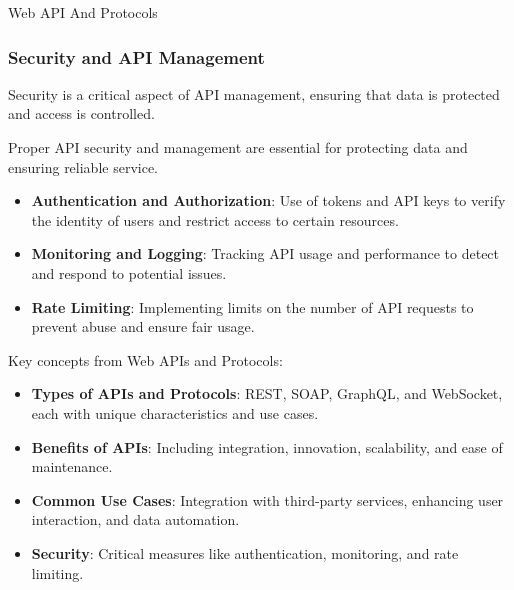 \begin{notes}{Web API And Protocols}
\begin{highlight}
    \end{highlight}
    
    \subsubsection*{Security and API Management}
    
    Security is a critical aspect of API management, ensuring that data is protected and access is controlled.
    
    \begin{highlight}
    
        Proper API security and management are essential for protecting data and ensuring reliable service.
        
        \begin{itemize}
            \item \textbf{Authentication and Authorization}: Use of tokens and API keys to verify the identity of users and restrict access to certain resources.
            \item \textbf{Monitoring and Logging}: Tracking API usage and performance to detect and respond to potential issues.
            \item \textbf{Rate Limiting}: Implementing limits on the number of API requests to prevent abuse and ensure fair usage.
        \end{itemize}
    
    \end{highlight}
    
    \begin{highlight}
    
        Key concepts from Web APIs and Protocols:
        
        \begin{itemize}
            \item \textbf{Types of APIs and Protocols}: REST, SOAP, GraphQL, and WebSocket, each with unique characteristics and use cases.
            \item \textbf{Benefits of APIs}: Including integration, innovation, scalability, and ease of maintenance.
            \item \textbf{Common Use Cases}: Integration with third-party services, enhancing user interaction, and data automation.
            \item \textbf{Security}: Critical measures like authentication, monitoring, and rate limiting.
        \end{itemize}
        
    \end{highlight}
\end{notes}

